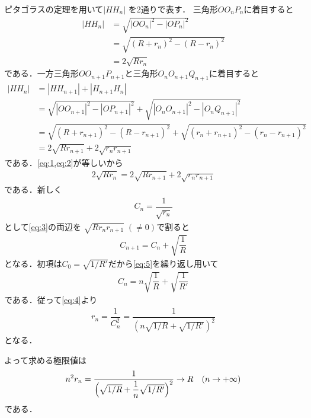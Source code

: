 \documentclass[../../main.tex]{subfiles}
\begin{document}
ピタゴラスの定理を用いて$|HH_n|$ を2通りで表す．
三角形$OO_nP_n$に着目すると
\begin{align}
  |HH_n|
  &= \sqrt{|OO_n|^2-|OP_n|^2} \\
  &= \sqrt{(R+r_n)^2 - (R-r_n)^2} \\
  &= 2\sqrt{Rr_n} \label{eq:1}
\end{align}
である．一方三角形$OO_{n+1}P_{n+1}$と三角形$O_nO_{n+1}Q_{n+1}$に着目すると
\begin{align}
  |HH_n|
  &= |HH_{n+1}| + |H_{n+1}H_n| \\
  &= \sqrt{|OO_{n+1}|^2-|OP_{n+1}|^2} + \sqrt{|O_nO_{n+1}|^2-|O_nQ_{n+1}|^2} \\
  &= \sqrt{(R+r_{n+1})^2 - (R-r_{n+1})^2} + \sqrt{(r_n+r_{n+1})^2 - (r_n-r_{n+1})^2} \\
  &= 2\sqrt{Rr_{n+1}} + 2\sqrt{r_n r_{n+1}} \label{eq:2}
\end{align}
である．\cref{eq:1,eq:2}が等しいから
\begin{align}
  2\sqrt{Rr_n} = 2\sqrt{Rr_{n+1}} + 2\sqrt{r_n r_{n+1}} \label{eq:3}
\end{align}
である．新しく
\begin{align}
  C_n = \dfrac{1}{\sqrt{r_n}} \label{eq:4}
\end{align}
として\cref{eq:3}の両辺を $\sqrt{Rr_n r_{n+1}} \; (\neq 0)$で割ると
\begin{align}
  C_{n+1} = C_n + \sqrt{\dfrac{1}{R}} \label{eq:5}
\end{align}
となる．初項は$C_0 = \sqrt{1/R'}$だから\cref{eq:5}を繰り返し用いて
\begin{align}
  C_n = n\sqrt{\dfrac{1}{R}} + \sqrt{\dfrac{1}{R'}} \label{eq:6}
\end{align}
である．従って\cref{eq:4}より
\begin{align}
  r_n = \dfrac{1}{C_n^2} = \dfrac{1}{(n\sqrt{1/R} + \sqrt{1/R'})^2}
\end{align}
となる．

よって求める極限値は
\begin{align}
  n^2 r_n = \dfrac{1}{\Bigl(\sqrt{1/R} + \dfrac{1}{n}\sqrt{1/R'}\Bigr)^2} \to R \quad (n \to +\infty)
\end{align}
である．
\end{document}
